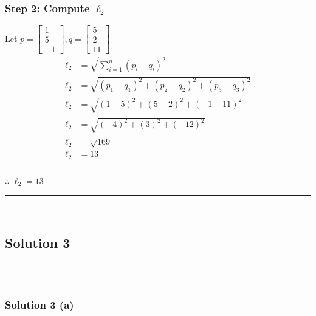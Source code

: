 \documentclass{article}
\begin{document}
\subsubsection*{Step 2: Compute $\ell_2$}
\parbox{\textwidth}{
Let $p = \begin{bmatrix} 1 \\ 5 \\ -1 \end{bmatrix}, q = \begin{bmatrix} 5 \\ 2 \\ 11 \end{bmatrix}$
$$
\begin{aligned}
\ell_2 &= \sqrt{\sum_{i=1}^{n} (p_i - q_i)^2}\\
\ell_2 &= \sqrt{(p_1 - q_1)^{2}+(p_2 - q_2)^{2}+(p_3 - q_3)^{2}}\\
\ell_2 &= \sqrt{(1 - 5)^{2}+(5 - 2)^{2}+(-1 - 11)^{2}}\\
\ell_2 &= \sqrt{(-4)^{2}+(3)^{2}+(-12)^{2}}\\
\ell_2 &= \sqrt{169}\\
\ell_2 &= 13
\end{aligned}
$$
}
\subsubsection*{\normalfont}{$\therefore$ $\ell_{2} = 13$}

\noindent\rule{\textwidth}{0.4pt}\\

\newpage

\subsection*{Solution 3}
\noindent\rule{\textwidth}{0.4pt}\\
\subsubsection*{Solution 3 (a)}
\end{document}
